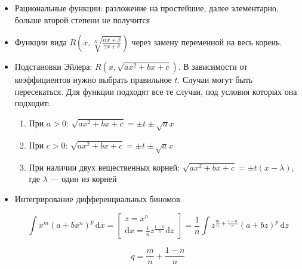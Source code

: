 \documentclass[12pt, a4paper]{article}
\begin{document}
\begin{itemize}
\begin{itemize}
      \item Рациональные функции: разложение на простейшие, далее элементарно, больше второй степени не получится
      \item Функции вида $R\left(x, \sqrt[N]{\frac{\alpha x + \beta}{\gamma x + \delta}}\right)$ через замену переменной на весь корень.
      \item Подстановки Эйлера: $R\left(x, \sqrt{ax^2 + bx + c}\right)$. В зависимости от коэффициентов нужно выбрать правильное $t$. 
      Случаи могут быть пересекаться. Для функции подходят все те случаи, под условия которых она подходит:
      \begin{enumerate}
        \item При $a > 0$: ${\sqrt {ax^{2}+bx+c}}=\pm t\pm {\sqrt {a}}x$
        \item При $c > 0$: ${ {\sqrt {ax^{2}+bx+c}}=\pm t\pm {\sqrt {a}}x}$
        \item При наличии двух вещественных корней: ${{\sqrt {ax^{2}+bx+c}}=\pm t(x-\lambda )}$, где $\lambda$ — один из корней
      \end{enumerate}
      \item Интегрирование дифференциальных биномов
      
      \begin{equation}
        \int x^{m}(a+bx^{n})^{p}\,\mathrm{d}x = \begin{bmatrix} z = x^n \\ \mathrm{d}x = \frac{1}{n} z^{\frac{1 - n}{n}} \mathrm{d}z \end{bmatrix} = \frac{1}{n} \int z^{\frac{m}{n} + \frac{1 - n}{n}}(a+bz)^{p}\,\mathrm{d}z
      \end{equation}

      \begin{equation}
        q = \frac{m}{n} + \frac{1 - n}{n}
      \end{equation}
      

\end{itemize}
\end{itemize}
\end{document}
